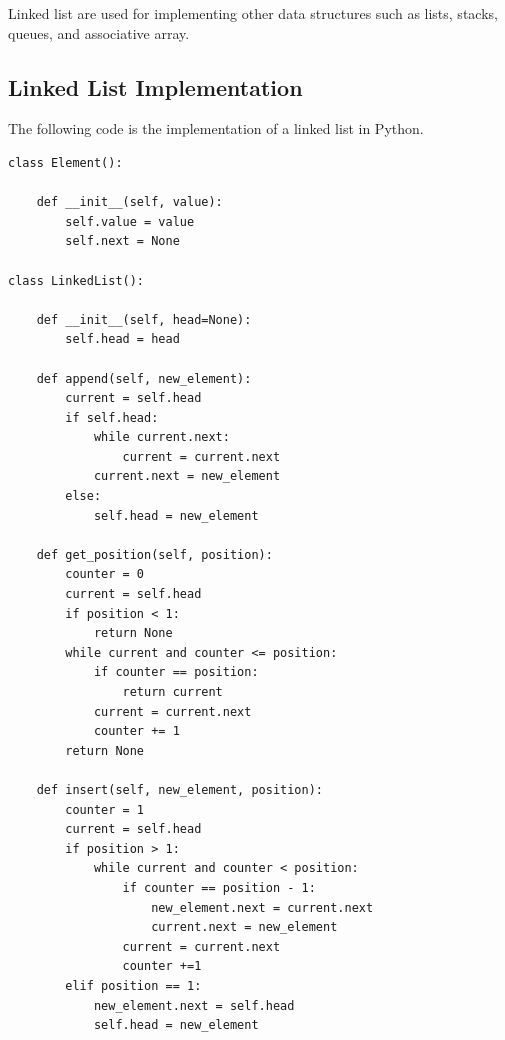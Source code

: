 Linked list are used for implementing other data structures such as lists, stacks, queues, and associative array.

\subsection{Linked List Implementation}
The following code is the implementation of a linked list in Python.
\begin{lstlisting}[firstnumber=1, caption={Linked List implementation.}]
class Element():

	def __init__(self, value):
		self.value = value
		self.next = None
		
class LinkedList():

	def __init__(self, head=None):
		self.head = head
		
	def append(self, new_element):
		current = self.head
		if self.head:
			while current.next:
				current = current.next
			current.next = new_element
		else:
			self.head = new_element
	
	def get_position(self, position):
		counter = 0
		current = self.head
		if position < 1:
			return None
		while current and counter <= position:
			if counter == position:
				return current
			current = current.next
			counter += 1
		return None
	
	def insert(self, new_element, position):
		counter = 1
		current = self.head
		if position > 1:
			while current and counter < position:
				if counter == position - 1:
					new_element.next = current.next
					current.next = new_element
				current = current.next
				counter +=1 
		elif position == 1:
			new_element.next = self.head
			self.head = new_element
\end{lstlisting}

